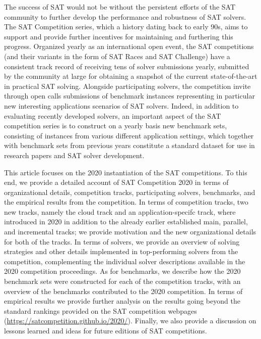 \documentclass{elsarticle}
\begin{document}
The success of SAT would not be without the persistent efforts of the SAT community to further develop the performance and robustness
of SAT solvers. The SAT Competition series, which a history dating back to early 90s, aims to support and provide further incentives 
for maintaining and furthering this progress. Organized yearly as an international open event, the SAT competitions (and their variants
in the form of SAT Races and SAT Challenge) have a consistent track record of receiving tens of solver submissions yearly, submitted
by the community at large for obtaining a snapshot of the current state-of-the-art in practical SAT solving. Alongside participating solvers,
the competition invite through open calls submissions of benchmark instances representing in particular new interesting applications 
scenarios of SAT solvers. Indeed, in addition to evaluating recently developed solvers, an important aspect of the SAT competition series is
to construct on a yearly basis new benchmark sets, consisting of instances from various different application settings, which together with benchmark sets from previous years constitute a standard dataset for use in research papers and SAT solver development. 

This article focuses on the 2020 instantiation of the SAT competitions. 
To this end, we provide
a detailed account of SAT Competition 2020 in terms of organizational details, competition tracks,
participating solvers, benchmarks, and the empirical results from the competition.
In terms of competition tracks, two new tracks, namely the cloud track and an application-specifc track, where introduced in 2020 
in addition to the already earlier established main, parallel, and incremental tracks; we
provide motivation and the new organizational details for both of the tracks.
In terms of solvers, we provide an overview of solving strategies and other details implemented in top-performing solvers
from the competition, complementing the individual solver descriptions available in the 2020 competition proceedings.
 As for benchmarks, we describe how the 2020 benchmark sets were constructed for each of the competition tracks, with 
an overview of the benchmarks contributed to the 2020 competition.
In terms of empirical results we provide further analysis on the results going beyond the standard rankings provided
on the SAT competition webpages (\url{https://satcompetition.github.io/2020/}). Finally, we also provide a discussion on lessons learned and ideas for future editions of SAT competitions.
\end{document}
